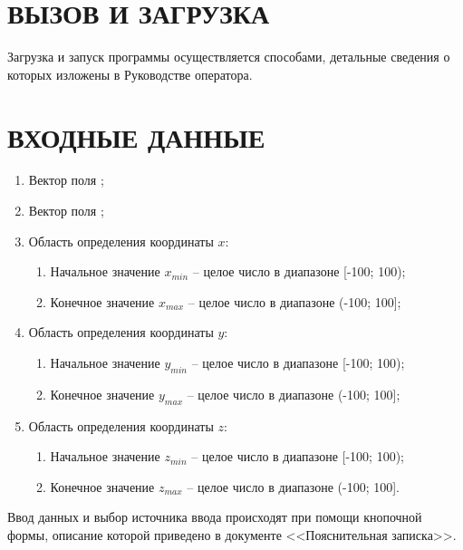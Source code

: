 \documentclass[14pt,a4paper,final]{extreport}
\begin{document}
\chapter{ВЫЗОВ И ЗАГРУЗКА}

Загрузка и запуск программы осуществляется способами, детальные сведения о которых изложены в Руководстве оператора.

\chapter{ВХОДНЫЕ ДАННЫЕ}
\label{inpdata}
\begin{enumerate}
	\item Вектор поля \fieldA;
	\item Вектор поля \fieldB;
	\item Область определения координаты \( x \):
	\begin{enumerate}
		\item[а)] Начальное значение \( x_{min} \) -- целое число в диапазоне [-100; 100);
		\item[б)] Конечное значение \( x_{max} \) -- целое число в диапазоне (-100; 100];
	\end{enumerate}
	\item Область определения координаты \( y \):
	\begin{enumerate}
		\item[а)] Начальное значение \( y_{min} \) -- целое число в диапазоне [-100; 100);
		\item[б)] Конечное значение \( y_{max} \) -- целое число в диапазоне (-100; 100];
	\end{enumerate}
	\item Область определения координаты \( z \):
	\begin{enumerate}
		\item[а)] Начальное значение \( z_{min} \) -- целое число в диапазоне [-100; 100);
		\item[б)] Конечное значение \( z_{max} \) -- целое число в диапазоне (-100; 100].
	\end{enumerate}
\end{enumerate}
Ввод данных и выбор источника ввода происходят при помощи кнопочной формы,
описание которой приведено в документе <<Пояснительная записка>>.
\end{document}
